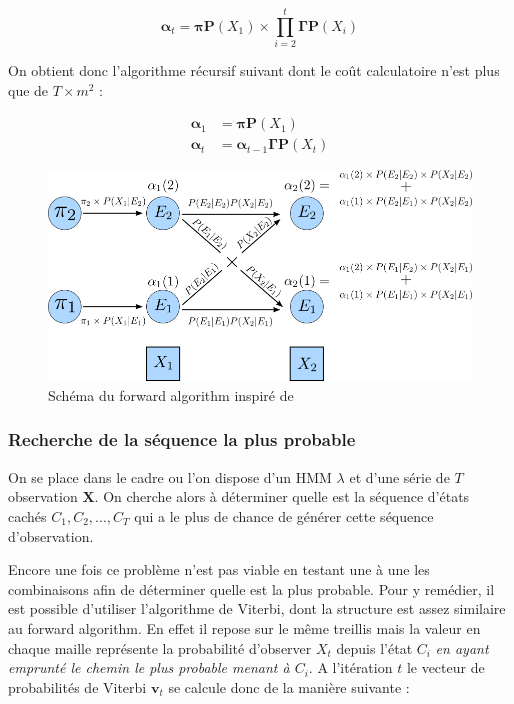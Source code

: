 \documentclass[12pt]{report}
\begin{document}
\begin{equation}
\bm{\alpha}_t = \bm{\pi} \bm{P}(X_1) \times \prod\limits_{i=2}^t \bm{\Gamma}\bm{P}(X_i)
\end{equation}

On obtient donc l'algorithme récursif suivant dont le coût calculatoire n'est plus que de $T \times m^2$ :

\begin{align} 
\label{eq::HMM:ForwardAlgo}
\bm{\alpha}_1 &= \bm{\pi} \bm{P}(X_1) \\ 
\bm{\alpha}_t &= \bm{\alpha}_{t-1} \bm{\Gamma} \bm{P}(X_t)
\end{align}

\begin{figure}[ht]
	\begin{center}
		\includegraphics[width=\textwidth]{Images/Models/HMM/Forward.png}
		\caption{Schéma du forward algorithm inspiré de \cite{jurafsky_speech_2017} }
		\label{fig::HMM:ForwardAlgo}
	\end{center}
\end{figure}

\subsubsection{Recherche de la séquence la plus probable}
On se place dans le cadre ou l'on dispose d'un HMM $\lambda$ et d'une série de $T$ observation $\bm{X}$. On cherche alors à déterminer quelle est la séquence d'états cachés $C_1,C_2,...,C_T$ qui a le plus de chance de générer cette séquence d'observation.

Encore une fois ce problème n'est pas viable en testant une à une les combinaisons afin de déterminer quelle est la plus probable. Pour y remédier, il est possible d'utiliser l'algorithme de Viterbi, dont la structure est assez similaire au forward algorithm. En effet il repose sur le même treillis mais la valeur en chaque maille représente la probabilité d'observer $X_t$ depuis l'état $C_i$ \textit{en ayant emprunté le chemin le plus probable menant à $C_i$}. A l'itération $t$ le vecteur de probabilités de Viterbi $\bm{v}_t$ se calcule donc de la manière suivante :
\end{document}
